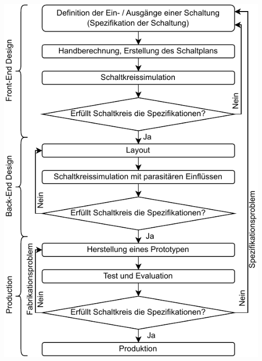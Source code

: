 \begin{minipage}[t]{0.6\columnwidth}
    \includegraphics[width=\columnwidth, align=t]{images/12_OTA_design.pdf}
\end{minipage}
\hfill
